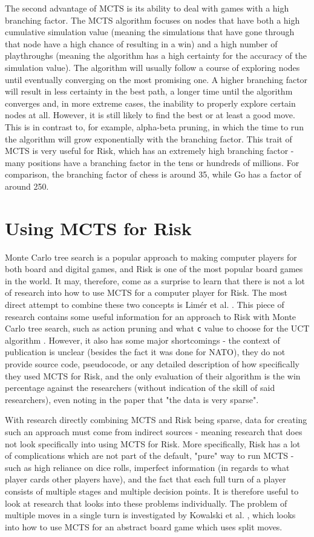 The second advantage of MCTS is its ability to deal with games with a high branching factor. The MCTS algorithm focuses on nodes that have both a high cumulative simulation value (meaning the simulations that have gone through that node have a high chance of resulting in a win) and a high number of playthroughs (meaning the algorithm has a high certainty for the accuracy of the simulation value). The algorithm will usually follow a course of exploring nodes until eventually converging on the most promising one. A higher branching factor will result in less certainty in the best path, a longer time until the algorithm converges and, in more extreme cases, the inability to properly explore certain nodes at all. However, it is still likely to find the best or at least a good move. This is in contrast to, for example, alpha-beta pruning, in which the time to run the algorithm will grow exponentially with the branching factor. This trait of MCTS is very useful for Risk, which has an extremely high branching factor \cite{bauer2023artificial} - many positions have a branching factor in the tens or hundreds of millions. For comparison, the branching factor of chess is around 35, while Go has a factor of around 250.

\section{Using MCTS for Risk}
\label{MCTSforRisk}
Monte Carlo tree search is a popular approach to making computer players for both board and digital games, and Risk is one of the most popular board games in the world. It may, therefore, come as a surprise to learn that there is not a lot of research into how to use MCTS for a computer player for Risk. The most direct attempt to combine these two concepts is Lim{\'e}r et al. \cite{limer2020monte}. This piece of research contains some useful information for an approach to Risk with Monte Carlo tree search, such as action pruning and what \texttt{c} value to choose for the UCT algorithm \cite{kocsis2006bandit}. However, it also has some major shortcomings - the context of publication is unclear (besides the fact it was done for NATO), they do not provide source code, pseudocode, or any detailed description of how specifically they used MCTS for Risk, and the only evaluation of their algorithm is the win percentage against the researchers (without indication of the skill of said researchers), even noting in the paper that "the data is very sparse".

With research directly combining MCTS and Risk being sparse, data for creating such an approach must come from indirect sources - meaning research that does not look specifically into using MCTS for Risk. More specifically, Risk has a lot of complications which are not part of the default, "pure" way to run MCTS - such as high reliance on dice rolls, imperfect information (in regards to what player cards other players have), and the fact that each full turn of a player consists of multiple stages and multiple decision points. It is therefore useful to look at research that looks into these problems individually. The problem of multiple moves in a single turn is investigated by Kowalski et al. \cite{kowalski2022split}, which looks into how to use MCTS for an abstract board game which uses split moves.